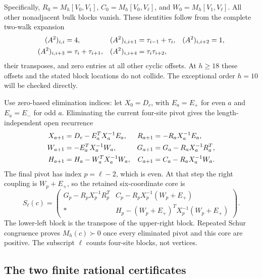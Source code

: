 Specifically, $R_0=M_h[V_0,V_1]$, $C_0=M_h[V_0,V_\ell]$, and
$W_0=M_h[V_1,V_\ell]$. All other nonadjacent bulk blocks vanish.
These identities follow from the complete two-walk expansion
\begin{align}
 (A^2)_{i,i}&=4,& (A^2)_{i,i+1}&=\tau_{i-1}+\tau_i,&
 (A^2)_{i,i+2}&=1,\notag\\
 (A^2)_{i,i+3}&=\tau_i+\tau_{i+1},&
 (A^2)_{i,i+4}&=\tau_i\tau_{i+2},&&
 \label{eq:two-walks}
\end{align}
their transposes, and zero entries at all other cyclic offsets. At
$h\ge18$ these offsets and the stated block locations do not collide.
The exceptional order $h=10$ will be checked directly.

Use zero-based elimination indices: let $X_0=D_c$, with $E_a=E_+$ for
even $a$ and $E_a=E_-$ for odd $a$. Eliminating the current four-site
pivot gives the length-independent open recurrence
\begin{align}
 X_{a+1}&=D_c-E_a^TX_a^{-1}E_a,&
 R_{a+1}&=-R_aX_a^{-1}E_a,\notag\\
 W_{a+1}&=-E_a^TX_a^{-1}W_a,&
 G_{a+1}&=G_a-R_aX_a^{-1}R_a^T,\label{eq:recurrence}\\
 H_{a+1}&=H_a-W_a^TX_a^{-1}W_a,&
 C_{a+1}&=C_a-R_aX_a^{-1}W_a.\notag
\end{align}
The final pivot has index $p=\ell-2$, which is even. At that step the
right coupling is $W_p+E_+$, so the retained six-coordinate core is
\begin{equation}
 S_\ell(c)=\begin{pmatrix}
 G_p-R_pX_p^{-1}R_p^T&C_p-R_pX_p^{-1}(W_p+E_+)\\
 *&H_p-(W_p+E_+)^TX_p^{-1}(W_p+E_+)
 \end{pmatrix}.
 \label{eq:single-core}
\end{equation}
The lower-left block is the transpose of the upper-right block.
Repeated Schur congruence proves $M_h(c)\succ0$ once every eliminated
pivot and this core are positive. The subscript $\ell$ counts four-site
blocks, not vertices.

\subsection{The two finite rational certificates}

